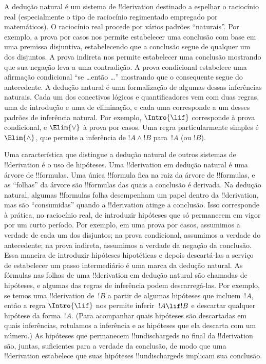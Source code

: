 \documentclass[../../../include/open-logic-section]{subfiles}
\begin{document}
      {}
      {}


A dedução natural é um sistema de !!{derivation} destinado a espelhar o
raciocínio real (especialmente o tipo de raciocínio regimentado
empregado por matemáticos).  O raciocínio real procede por vários
padrões ``naturais''. Por exemplo, a prova por casos nos permite
estabelecer uma conclusão com base em uma premissa disjuntiva,
estabelecendo que a conclusão segue de qualquer um dos disjuntos. A
prova indireta nos permite estabelecer uma conclusão mostrando que sua
negação leva a uma contradição. A prova condicional estabelece uma
afirmação condicional ``se \dots então \dots'' mostrando que o
consequente segue do antecedente.  A dedução natural é uma formalização
de algumas dessas inferências naturais.  Cada um dos conectivos
lógicos e quantificadores vem com duas regras, uma de introdução e uma
de eliminação, e cada uma corresponde a um desses padrões de inferência
natural. Por exemplo, $\Intro{\lif}$ corresponde à prova condicional, e
$\Elim{\lor}$ à prova por casos.  Uma regra particularmente simples é
$\Elim{\land}$, que permite a inferência de $!A \land !B$ para~$!A$
(ou $!B$).

Uma característica que distingue a dedução natural de outros sistemas
de !!{derivation} é o uso de hipóteses. Uma !!{derivation} em dedução
natural é uma árvore de !!{formula}s.  Uma única !!{formula}
fica na raiz da árvore de !!{formula}s, e as ``folhas'' da árvore são
!!{formula}s das quais a conclusão é derivada.  Na dedução natural,
algumas !!{formula}s folha desempenham um papel dentro da
!!{derivation}, mas são ``consumidas'' quando a !!{derivation} atinge a
conclusão. Isso corresponde à prática, no raciocínio real, de introduzir
hipóteses que só permanecem em vigor por um curto período.  Por
exemplo, em uma prova por casos, assumimos a verdade de cada um dos
disjuntos; na prova condicional, assumimos a verdade do antecedente; na
prova indireta, assumimos a verdade da negação da conclusão.  Essa
maneira de introduzir hipóteses hipotéticas e depois descartá-las a
serviço de estabelecer um passo intermediário é uma marca da dedução
natural. As fórmulas nas folhas de uma !!{derivation} em dedução
natural são chamadas de hipóteses, e algumas das regras de inferência
podem descarregá-las.  Por exemplo, se temos uma !!{derivation}
de~$!B$ a partir de algumas hipóteses que incluem~$!A$, então a regra
$\Intro{\lif}$ nos permite inferir~$!A \lif !B$ e descartar qualquer
hipótese da forma~$!A$. (Para acompanhar quais hipóteses são descartadas
em quais inferências, rotulamos a inferência e as hipóteses que ela
descarta com um número.)  As hipóteses que permanecem
!!{undischarged}s no final da !!{derivation} são, juntas, suficientes
para a verdade da conclusão, de modo que uma !!{derivation} estabelece
que suas hipóteses !!{undischarged}s implicam sua conclusão.
\end{document}
